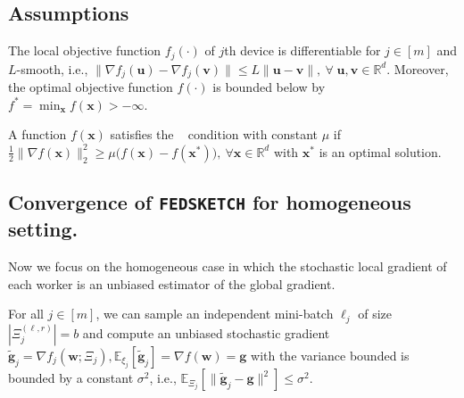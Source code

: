 \subsection{Assumptions}


\begin{assumption}\label{Assu:1}
The local objective function $f_j(\cdot)$ of $j$th device is differentiable for $j\in [m]$ and $L$-smooth, i.e., $\|\nabla f_j(\boldsymbol{u})-\nabla f_j(\mathbf{v})\|\leq L\|\boldsymbol{u}-\mathbf{v}\|,\: \forall \;\boldsymbol{u},\mathbf{v}\in\mathbb{R}^d$. Moreover, the optimal objective function $f(\cdot)$ is bounded below by ${f^*} = \min_{\boldsymbol{x}} f(\boldsymbol{x})>-\infty$. 
\end{assumption}

\begin{assumption}[\pl]\label{assum:pl}
A function $f(\boldsymbol{x})$ satisfies the \pl~ condition with constant $\mu$ if $\frac{1}{2}\|\nabla f(\boldsymbol{x})\|_2^2\geq \mu\big(f(\boldsymbol{x})-f(\boldsymbol{x}^*)\big),\: \forall \boldsymbol{x}\in\mathbb{R}^d $ with $\boldsymbol{x}^*$ is an optimal solution.
\end{assumption}


\subsection{Convergence of  \texttt{FEDSKETCH} for homogeneous setting.} 
Now we focus on the homogeneous case in which the stochastic local gradient of each worker is an unbiased estimator of the global gradient.


\begin{assumption}\label{Assu:1.5}
For all $j\in [m]$, we can sample an independent mini-batch $\ell_j$   of size $|\Xi_j^{(\ell,r)}| = b$ and compute an unbiased stochastic gradient  $\tilde{\mathbf{g}}_j = \nabla f_j(\boldsymbol{w}; \Xi_j), \mathbb{E}_{\xi_j}[\tilde{\mathbf{g}}_j] = \nabla f(\boldsymbol{w})=\mathbf{g}$ with  the variance bounded is bounded by a constant $\sigma^2$, i.e., $
\mathbb{E}_{\Xi_j}\left[\|\tilde{\mathbf{g}}_j-\mathbf{g}\|^2\right]\leq \sigma^2$.
\end{assumption}


